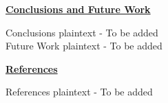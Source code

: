 \documentclass[]{report}
\newcommand{\sectionTitle}[1]{ {\large\textbf{\uline{#1}}} \\ \vspace{1.5em} }
\newcommand{\textConclusions}{Conclusions plaintext - To be added}
\newcommand{\textFutureWork}{Future Work plaintext - To be added}
\newcommand{\textReferences}{References plaintext - To be added}
\begin{document}
\begin{flushleft}
		\sectionTitle{Conclusions and Future Work}
			
		\textConclusions \\ \vspace{1em}
		\textFutureWork \\ \vspace{1em}
			
		\sectionTitle{References}
			
		\textReferences \\ \vspace{1em}
			
	\end{flushleft}
	
\end{document}
